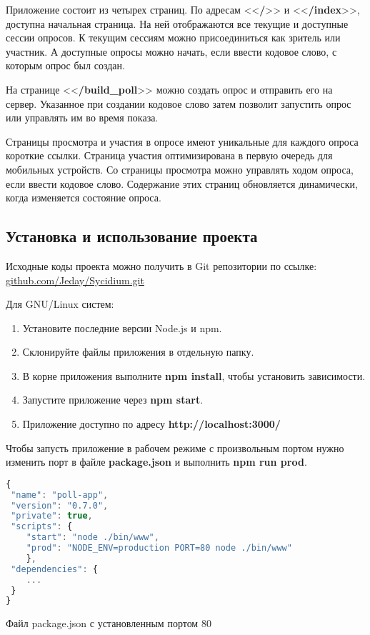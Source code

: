 Приложение состоит из четырех страниц. По адресам <<\textbf{/}>> и <<\textbf{/index}>>, доступна начальная страница. На ней отображаются все текущие и доступные сессии опросов. К текущим сессиям можно присоединиться как зритель или участник. А доступные опросы можно начать, если ввести кодовое слово, с которым опрос был создан.

На странице <<\textbf{/build\_poll}>> можно создать опрос и отправить его на сервер. Указанное при создании кодовое слово затем позволит запустить опрос или управлять им во время показа.

Страницы просмотра и участия в опросе имеют уникальные для каждого опроса короткие ссылки. Страница участия оптимизирована в первую очередь для мобильных устройств. Со страницы просмотра можно управлять ходом опроса, если ввести кодовое слово. Содержание этих страниц обновляется динамически, когда изменяется состояние опроса.     
          
\subsection{Установка и использование проекта}  
Исходные коды проекта можно получить в Git репозитории по ссылке:
\href{https://github.com/Jeday/Sycidium.git}{github.com/Jeday/Sycidium.git}

Для GNU/Linux систем:
\begin{enumerate}
	\item Установите последние версии Node.js и npm.
	\item Склонируйте файлы приложения в отдельную папку.
	\item В корне приложения выполните \textbf{npm install}, чтобы установить зависимости.
	\item Запустите приложение через \textbf{npm start}.
	\item Приложение доступно по адресу \textbf{http://localhost:3000/}
\end{enumerate}

Чтобы запусть приложение в рабочем режиме с произвольным портом нужно изменить порт в файле \textbf{package.json} и выполнить \textbf{npm run prod}.
  \begin{ListingEnv}
 \begin{lstlisting}[language=JavaScript]
{
 "name": "poll-app",
 "version": "0.7.0",
 "private": true,
 "scripts": {
 	"start": "node ./bin/www",
 	"prod": "NODE_ENV=production PORT=80 node ./bin/www"
    },
 "dependencies": {
	...
 }
}

\end{lstlisting}
	\caption{Файл package.json с установленным портом 80}
\label{list:pack-json}
\end{ListingEnv}      



